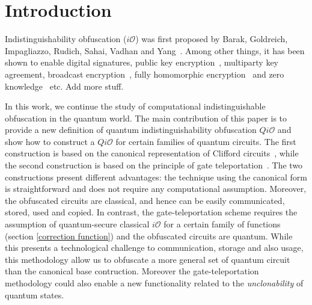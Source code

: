 \section{Introduction}

Indistinguishability obfuscation ($i\mathcal{O}$) was first proposed by Barak, Goldreich, Impagliazzo, Rudich, Sahai, Vadhan and Yang~\cite{BGI+12}. Among other things, it has been shown to enable digital signatures, public key encryption~\cite{SW14}, multiparty key agreement, broadcast encryption~\cite{BZ14}, fully homomorphic encryption~\cite{CLTV15} and zero knowledge~\cite{BP15} etc.   Add more stuff. 





In this work, we continue the study of computational indistinguishable obfuscation in the quantum world.
The main contribution of this paper is to provide a new definition of quantum indistinguishability obfuscation $Qi\mathcal{O}$ and show how to construct a $Qi\mathcal{O}$ for certain families of quantum circuits. The first construction is based on the canonical representation of Clifford circuits~\cite{AG04}, while the second construction is based on the principle of gate teleportation~\cite{GC99}. The two constructions present different advantages: the technique using the canonical form is straightforward and does not require any computational assumption. Moreover, the obfuscated circuits are classical, and hence can be easily communicated, stored, used and copied.  In contrast, the gate-teleportation scheme requires the assumption of quantum-secure classical $i\mathcal{O}$ for a certain family of functions (section \ref{correction function}) and the obfuscated circuits are quantum. While this presents a technological challenge to communication, storage and also usage, this methodology allow us to obfuscate a more general set of quantum circuit than the canonical base contruction. Moreover the gate-teleportation methodology could also enable a new functionality related to the \emph{unclonability} of quantum states. 


